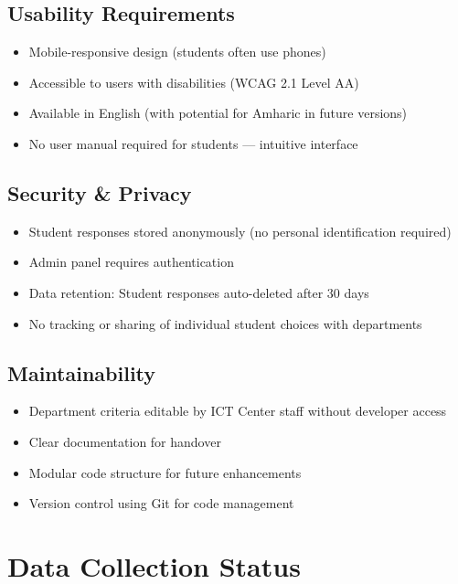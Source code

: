 \documentclass[12pt, a4paper]{article}
\begin{document}
\subsection{Usability Requirements}
\begin{itemize}[leftmargin=1.5em, itemsep=3pt]
\item Mobile-responsive design (students often use phones)
\item Accessible to users with disabilities (WCAG 2.1 Level AA)
\item Available in English (with potential for Amharic in future versions)
\item No user manual required for students — intuitive interface
\end{itemize}

\subsection{Security \& Privacy}
\begin{itemize}[leftmargin=1.5em, itemsep=3pt]
\item Student responses stored anonymously (no personal identification required)
\item Admin panel requires authentication
\item Data retention: Student responses auto-deleted after 30 days
\item No tracking or sharing of individual student choices with departments
\end{itemize}

\subsection{Maintainability}
\begin{itemize}[leftmargin=1.5em, itemsep=3pt]
\item Department criteria editable by ICT Center staff without developer access
\item Clear documentation for handover
\item Modular code structure for future enhancements
\item Version control using Git for code management
\end{itemize}

\section{Data Collection Status}
\end{document}
